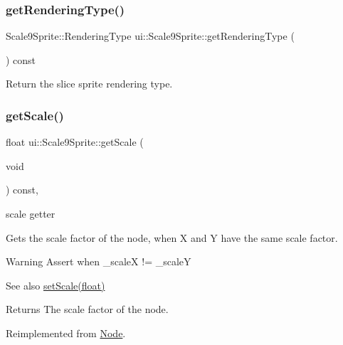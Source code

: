 \subsubsection{\texorpdfstring{get\+Rendering\+Type()}{getRenderingType()}\hspace{0.1cm}{\footnotesize\ttfamily [2/2]}}
{\footnotesize\ttfamily Scale9\+Sprite\+::\+Rendering\+Type ui\+::\+Scale9\+Sprite\+::get\+Rendering\+Type (\begin{DoxyParamCaption}{ }\end{DoxyParamCaption}) const}

Return the slice sprite rendering type. \mbox{\label{classui_1_1Scale9Sprite_a83a48c3e969e9ae2d0d4bca560159bff}} 
\subsubsection{\texorpdfstring{get\+Scale()}{getScale()}}
{\footnotesize\ttfamily float ui\+::\+Scale9\+Sprite\+::get\+Scale (\begin{DoxyParamCaption}\item[{void}]{ }\end{DoxyParamCaption}) const\hspace{0.3cm}{\ttfamily [override]}, {\ttfamily [virtual]}}



scale getter 

Gets the scale factor of the node, when X and Y have the same scale factor.

\begin{DoxyWarning}{Warning}
Assert when {\ttfamily \+\_\+scaleX != \+\_\+scaleY} 
\end{DoxyWarning}
\begin{DoxySeeAlso}{See also}
\hyperlink{classui_1_1Scale9Sprite_a6824394dc8d5f26668b5e6f8b3cae3ba}{set\+Scale(float)}
\end{DoxySeeAlso}
\begin{DoxyReturn}{Returns}
The scale factor of the node. 
\end{DoxyReturn}


Reimplemented from \hyperlink{classNode_ac9926440d4edab1020d348a2b950307c}{Node}.

\mbox{\label{classui_1_1Scale9Sprite_a3aaed8de223156f4567a4b59e208e66d}} 
